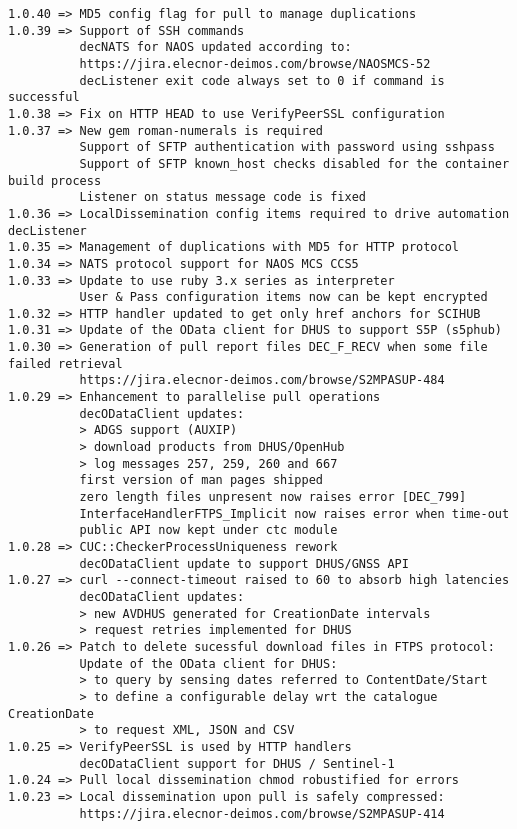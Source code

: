 \documentclass[dec_sum_main.tex]{subfiles}
\begin{document}
\begin{Verbatim}[tabsize=4]
1.0.40 => MD5 config flag for pull to manage duplications
1.0.39 => Support of SSH commands
          decNATS for NAOS updated according to:
          https://jira.elecnor-deimos.com/browse/NAOSMCS-52
          decListener exit code always set to 0 if command is successful
1.0.38 => Fix on HTTP HEAD to use VerifyPeerSSL configuration
1.0.37 => New gem roman-numerals is required
          Support of SFTP authentication with password using sshpass
          Support of SFTP known_host checks disabled for the container build process
          Listener on status message code is fixed
1.0.36 => LocalDissemination config items required to drive automation decListener
1.0.35 => Management of duplications with MD5 for HTTP protocol
1.0.34 => NATS protocol support for NAOS MCS CCS5
1.0.33 => Update to use ruby 3.x series as interpreter
          User & Pass configuration items now can be kept encrypted
1.0.32 => HTTP handler updated to get only href anchors for SCIHUB
1.0.31 => Update of the OData client for DHUS to support S5P (s5phub)
1.0.30 => Generation of pull report files DEC_F_RECV when some file failed retrieval
          https://jira.elecnor-deimos.com/browse/S2MPASUP-484
1.0.29 => Enhancement to parallelise pull operations
          decODataClient updates:
          > ADGS support (AUXIP)
          > download products from DHUS/OpenHub
          > log messages 257, 259, 260 and 667
          first version of man pages shipped
          zero length files unpresent now raises error [DEC_799]
          InterfaceHandlerFTPS_Implicit now raises error when time-out 
          public API now kept under ctc module
1.0.28 => CUC::CheckerProcessUniqueness rework
          decODataClient update to support DHUS/GNSS API
1.0.27 => curl --connect-timeout raised to 60 to absorb high latencies
          decODataClient updates:
          > new AVDHUS generated for CreationDate intervals
          > request retries implemented for DHUS
1.0.26 => Patch to delete sucessful download files in FTPS protocol:
          Update of the OData client for DHUS:
          > to query by sensing dates referred to ContentDate/Start
          > to define a configurable delay wrt the catalogue CreationDate
          > to request XML, JSON and CSV
1.0.25 => VerifyPeerSSL is used by HTTP handlers
          decODataClient support for DHUS / Sentinel-1
1.0.24 => Pull local dissemination chmod robustified for errors
1.0.23 => Local dissemination upon pull is safely compressed:
          https://jira.elecnor-deimos.com/browse/S2MPASUP-414

\end{Verbatim}
\end{document}
